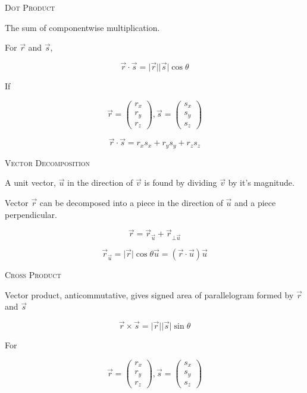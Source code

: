 \documentclass{article}
\begin{document}
\textsc{Dot Product}

The sum of componentwise multiplication.

For $\vec{r}$ and $\vec{s}$, 

\[
\vec{r} \cdot \vec{s} = \lvert \vec{r}\rvert \lvert\vec{s}\rvert\cos{\theta}
\]

If 

\[
\vec{r} = \left( \begin{array}{c} 
 r_x  \\
 r_y  \\
 r_z
\end{array} \right), \vec{s} = \left( \begin{array}{c}
 s_x  \\
 s_y  \\
 s_z
\end{array} \right)
\]

\[
\vec{r} \cdot \vec{s} = r_xs_x + r_ys_y + r_zs_z
\]

\bigskip

\textsc{Vector Decomposition}

A unit vector, $\vec{u}$ in the direction of $\vec{v}$ is found by dividing $\vec{v}$ by it's magnitude.

Vector $\vec{r}$ can be decomposed into a piece in the direction of $\vec{u}$ and a piece perpendicular.

\[
\vec{r} = \vec{r}_{\vec{u}} + \vec{r}_{\bot\vec{u}}
\]

\[
\vec{r}_{\vec{u}} = \lvert \vec{r} \rvert \cos{\theta} \vec{u} = (\vec{r} \cdot \vec{u})\vec{u}
\]

\bigskip

\textsc{Cross Product}

Vector product, anticommutative, gives signed area of parallelogram formed by $\vec{r}$ and $\vec{s}$

\[
\vec{r} \times \vec{s} = \lvert \vec{r} \rvert \lvert \vec{s} \rvert \sin{\theta}
\]

For

\[
\vec{r} = \left( \begin{array}{c} 
 r_x  \\
 r_y  \\
 r_z
\end{array} \right), \vec{s} = \left( \begin{array}{c}
 s_x  \\
 s_y  \\
 s_z
\end{array} \right)
\]
\end{document}
